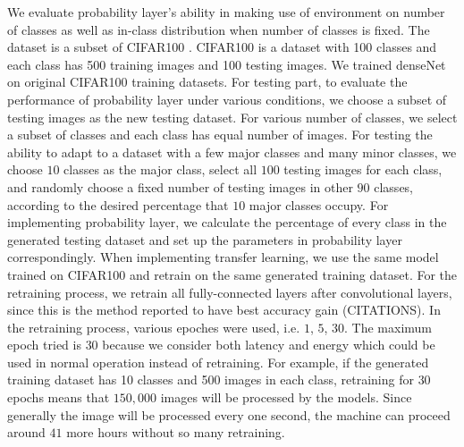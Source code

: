 \documentclass{article}
\begin{document}
We evaluate probability layer's ability in making use of environment on number of classes as well as in-class distribution when number of classes is fixed. The dataset is a subset of CIFAR100 \cite{krizhevsky2009learning}. CIFAR100 \cite{krizhevsky2009learning} is a dataset with 100 classes and each class has 500 training images and 100 testing images. We trained denseNet \cite{huang2017densely} on original CIFAR100 training datasets. For testing part, to evaluate the performance of probability layer under various conditions, we choose a subset of testing images as the new testing dataset. For various number of classes, we select a subset of classes and each class has equal number of images. For testing the ability to adapt to a dataset with a few major classes and many minor classes, we choose $10$ classes as the major class, select all $100$ testing images for each class, and randomly choose a fixed number of testing images in other $90$ classes, according to the desired percentage that $10$ major classes occupy. For implementing probability layer, we calculate the percentage of every class in the generated testing dataset and set up the parameters in probability layer correspondingly. When implementing transfer learning, we use the same model trained on CIFAR100 and retrain on the same generated training dataset. For the retraining process, we retrain all fully-connected layers after convolutional layers, since this is the method reported to have best accuracy gain (CITATIONS). In the retraining process, various epoches were used, i.e. $1$, $5$, $30$. The maximum epoch tried is $30$ because we consider both latency and energy which could be used in normal operation instead of retraining. For example, if the generated training dataset has 10 classes and 500 images in each class, retraining for $30$ epochs means that $150,000$ images will be processed by the models. Since generally the image will be processed every one second, the machine can proceed around $41$ more hours without so many retraining.
\end{document}
